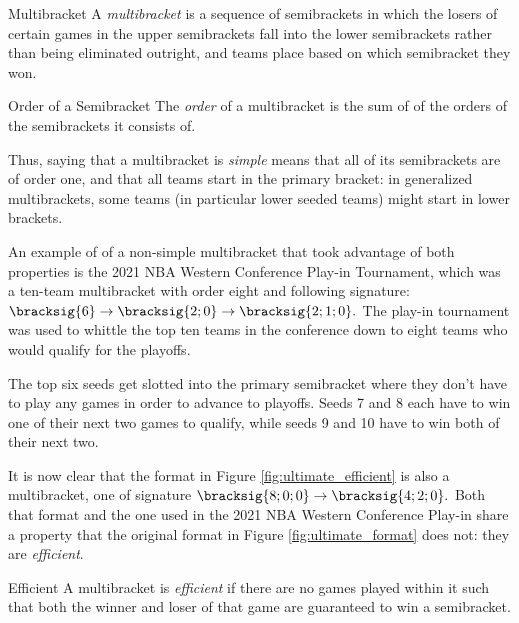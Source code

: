 {    \begin{definition}{Multibracket}{} 
        A \textit{multibracket} is a sequence of semibrackets in which the losers of certain games in the upper semibrackets fall into the lower semibrackets rather than being eliminated outright, and teams place based on which semibracket they won.
    \end{definition}

    \begin{definition}{Order of a Semibracket}{}
        The \textit{order} of a multibracket is the sum of of the orders of the semibrackets it consists of.
    \end{definition}

    Thus, saying that a multibracket is \textit{simple} means that all of its semibrackets are of order one, and that all teams start in the primary bracket: in generalized multibrackets, some teams (in particular lower seeded teams) might start in lower brackets.
    
    An example of of a non-simple multibracket that took advantage of both properties is the 2021 NBA Western Conference Play-in Tournament, which was a ten-team multibracket with order eight and following signature:
    $\bracksig{6} \to \bracksig{2;0} \to \bracksig{2;1;0}.$ The play-in tournament was used to whittle the top ten teams in the conference down to eight teams who would qualify for the playoffs.


    The top six seeds get slotted into the primary semibracket where they don't have to play any games in order to advance to playoffs. Seeds 7 and 8 each have to win one of their next two games to qualify, while seeds 9 and 10 have to win both of their next two.

    It is now clear that the format in Figure \ref{fig:ultimate_efficient} is also a multibracket, one of signature $\bracksig{8;0;0} \to \bracksig{4;2;0}.$ Both that format and the one used in the 2021 NBA Western Conference Play-in share a property that the original format in Figure \ref{fig:ultimate_format} does not: they are \textit{efficient}.

    \begin{definition}{Efficient}{}
        A multibracket is \textit{efficient} if there are no games played within it such that both the winner and loser of that game are guaranteed to win a semibracket.
    \end{definition}

}
